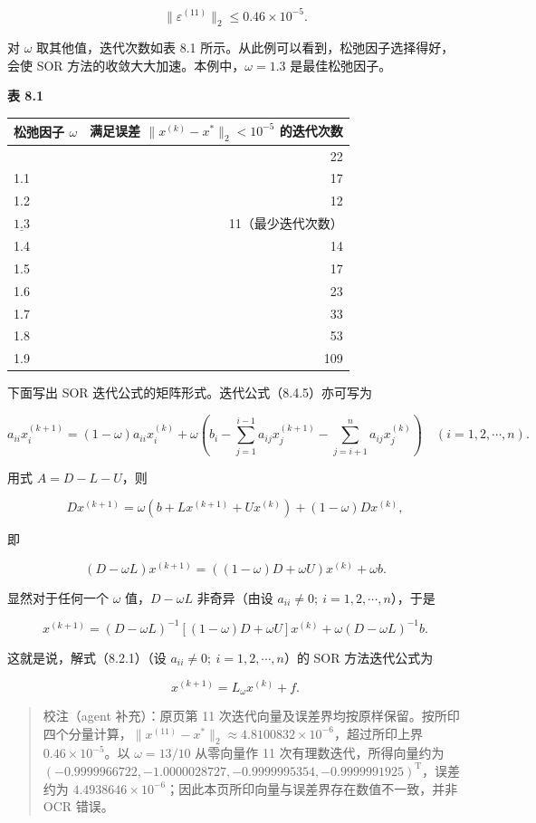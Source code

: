 \documentclass[
  10pt,
  fontset=fandol]{ctexart}
\newcounter{none} %
\begin{document}
\[
\|\varepsilon^{(11)}\|_2\leqslant0.46\times10^{-5}.
\]

对 \(\omega\) 取其他值，迭代次数如表 8.1 所示。从此例可以看到，松弛因子选择得好，会使 SOR 方法的收敛大大加速。本例中，\(\omega=1.3\) 是最佳松弛因子。


\textbf{表 8.1}

{\def\LTcaptype{none} %
\begin{longtable}[]{@{}lr@{}}
\toprule\noalign{}
松弛因子 \(\omega\) & 满足误差 \(\|x^{(k)}-x^*\|_2<10^{-5}\) 的迭代次数 \\
\midrule\noalign{}
\endhead
\bottomrule\noalign{}
\endlastfoot
1.0 & 22 \\
1.1 & 17 \\
1.2 & 12 \\
\(\underline{1.3}\) & 11（最少迭代次数） \\
1.4 & 14 \\
1.5 & 17 \\
1.6 & 23 \\
1.7 & 33 \\
1.8 & 53 \\
1.9 & 109 \\
\end{longtable}
}

下面写出 SOR 迭代公式的矩阵形式。迭代公式（8.4.5）亦可写为

\[
a_{ii}x_i^{(k+1)}=(1-\omega)a_{ii}x_i^{(k)}+\omega\left(b_i-\sum_{j=1}^{i-1}a_{ij}x_j^{(k+1)}-\sum_{j=i+1}^n a_{ij}x_j^{(k)}\right)\quad(i=1,2,\cdots,n).
\tag{8.4.7}
\]

用式 \(A=D-L-U\)，则

\[
Dx^{(k+1)}=\omega(b+Lx^{(k+1)}+Ux^{(k)})+(1-\omega)Dx^{(k)},
\]

即

\[
(D-\omega L)x^{(k+1)}=((1-\omega)D+\omega U)x^{(k)}+\omega b.
\]

显然对于任何一个 \(\omega\) 值，\(D-\omega L\) 非奇异（由设 \(a_{ii}\neq0;\ i=1,2,\cdots,n\)），于是

\[
x^{(k+1)}=(D-\omega L)^{-1}[(1-\omega)D+\omega U]x^{(k)}+\omega(D-\omega L)^{-1}b.
\]

这就是说，解式（8.2.1）（设 \(a_{ii}\neq0;\ i=1,2,\cdots,n\)）的 SOR 方法迭代公式为

\[
x^{(k+1)}=L_\omega x^{(k)}+f.
\tag{8.4.8}
\]

\begin{quote}
校注（agent 补充）：原页第 11 次迭代向量及误差界均按原样保留。按所印四个分量计算，\(\|x^{(11)}-x^*\|_2\approx4.8100832\times10^{-6}\)，超过所印上界 \(0.46\times10^{-5}\)。以 \(\omega=13/10\) 从零向量作 11 次有理数迭代，所得向量约为 \((-0.9999966722,-1.0000028727,-0.9999995354,-0.9999991925)^{\mathrm T}\)，误差约为 \(4.4938646\times10^{-6}\)；因此本页所印向量与误差界存在数值不一致，并非 OCR 错误。
\end{quote}
\end{document}
